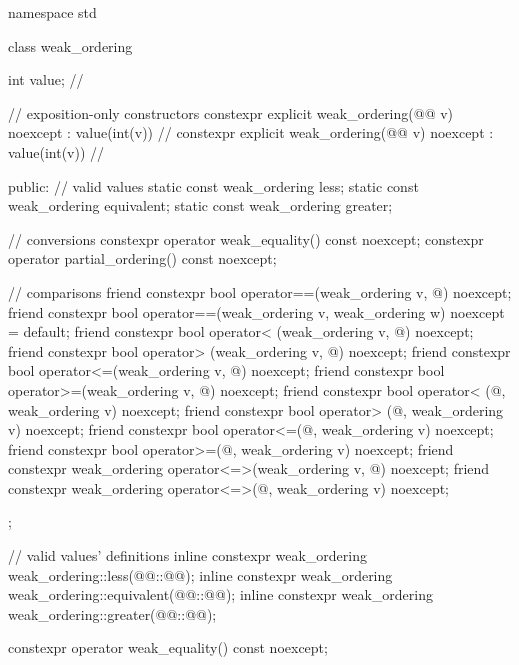 %
%
%
%
\begin{codeblock}
namespace std {
  class weak_ordering {
    int value;  // \expos

    // exposition-only constructors
    constexpr explicit weak_ordering(@@ v) noexcept : value(int(v)) {}  // \expos
    constexpr explicit weak_ordering(@@ v) noexcept : value(int(v)) {} // \expos

  public:
    // valid values
    static const weak_ordering less;
    static const weak_ordering equivalent;
    static const weak_ordering greater;

    // conversions
    constexpr operator weak_equality() const noexcept;
    constexpr operator partial_ordering() const noexcept;

    // comparisons
    friend constexpr bool operator==(weak_ordering v, @\unspec@) noexcept;
    friend constexpr bool operator==(weak_ordering v, weak_ordering w) noexcept = default;
    friend constexpr bool operator< (weak_ordering v, @\unspec@) noexcept;
    friend constexpr bool operator> (weak_ordering v, @\unspec@) noexcept;
    friend constexpr bool operator<=(weak_ordering v, @\unspec@) noexcept;
    friend constexpr bool operator>=(weak_ordering v, @\unspec@) noexcept;
    friend constexpr bool operator< (@\unspec@, weak_ordering v) noexcept;
    friend constexpr bool operator> (@\unspec@, weak_ordering v) noexcept;
    friend constexpr bool operator<=(@\unspec@, weak_ordering v) noexcept;
    friend constexpr bool operator>=(@\unspec@, weak_ordering v) noexcept;
    friend constexpr weak_ordering operator<=>(weak_ordering v, @\unspec@) noexcept;
    friend constexpr weak_ordering operator<=>(@\unspec@, weak_ordering v) noexcept;
  };

  // valid values' definitions
  inline constexpr weak_ordering weak_ordering::less(@@::@@);
  inline constexpr weak_ordering weak_ordering::equivalent(@@::@@);
  inline constexpr weak_ordering weak_ordering::greater(@@::@@);
}
\end{codeblock}

%
\begin{itemdecl}
constexpr operator weak_equality() const noexcept;
\end{itemdecl}

